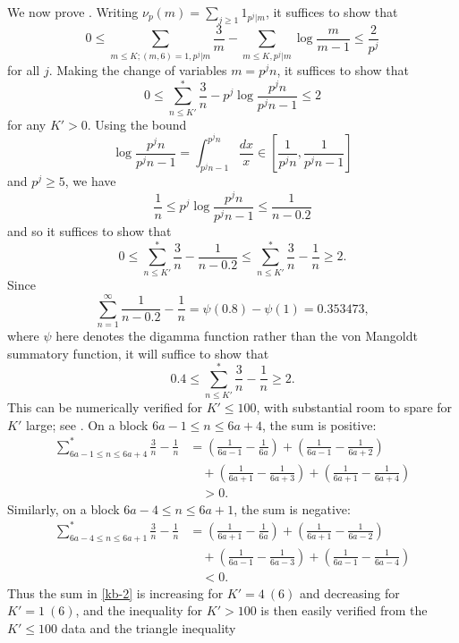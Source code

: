 \documentclass[12pt,a4paper,reqno]{amsart}
\numberwithin{equation}{section}
\theoremstyle{plain}
\theoremstyle{definition}
\begin{document}
We now prove . Writing $\nu_p(m) = \sum_{j \geq 1} 1_{p^j|m}$, it suffices to show that
  $$ 0 \leq \sum_{m \leq K; (m,6)=1, p^j|m} \frac{3}{m}
  - \sum_{m \leq K, p^j|m} \log \frac{m}{m-1} \leq \frac{2}{p^j}$$
  for all $j$.  Making the change of variables $m = p^j n$, it suffices to show that
  $$ 0 \leq \sum_{n \leq K'}^* \frac{3}{n}  - p^j \log \frac{p^j n}{p^j n - 1} \leq 2$$
  for any $K' > 0$.   Using the bound
  $$ \log \frac{p^jn}{p^jn - 1} = \int_{p^jn-1}^{p^jn} \frac{dx}{x} \in \left[\frac{1}{p^j n}, \frac{1}{p^jn-1}\right]$$
  and $p^j \geq 5$, we have
  $$ \frac{1}{n} \leq p^j \log \frac{p^j n}{p^j n - 1} \leq \frac{1}{n-0.2}$$
  and so it suffices to show that
  \begin{equation}\label{kb}
  0 \leq \sum_{n \leq K'}^* \frac{3}{n}  - \frac{1}{n-0.2} 
  \leq
  \sum_{n \leq K'}^* \frac{3}{n} - \frac{1}{n} \geq 2.
  \end{equation}
  Since 
  $$ \sum_{n=1}^\infty \frac{1}{n-0.2}-\frac{1}{n} = \psi(0.8)-\psi(1) = 0.353473,$$
  where $\psi$ here denotes the digamma function rather than the von Mangoldt summatory function, it will suffice to show that
  \begin{equation}\label{kb-2} 0.4 \leq
  \sum_{n \leq K'}^* \frac{3}{n} - \frac{1}{n} \geq 2.\end{equation}
  This can be numerically verified for $K' \leq 100$, with substantial room to spare for $K'$ large; see . On a block $6a-1 \leq n \leq 6a+4$, the sum is positive:
  \begin{align*}
  \sum_{6a-1 \leq n \leq 6a+4}^* \frac{3}{n}  - \frac{1}{n } &= \left(\frac{1}{6a-1} - \frac{1}{6a}\right) + \left(\frac{1}{6a-1} - \frac{1}{6a+2}\right)\\
  &\quad + \left(\frac{1}{6a+1} - \frac{1}{6a+3}\right) + \left(\frac{1}{6a+1} - \frac{1}{6a+4}\right) \\
  &\quad > 0.
  \end{align*}
  Similarly, on a block $6a-4 \leq n \leq 6a+1$, the sum is negative:
  \begin{align*}
    \sum_{6a-4 \leq n \leq 6a+1}^* \frac{3}{n}  - \frac{1}{n } &= \left(\frac{1}{6a+1} - \frac{1}{6a}\right)
    + \left(\frac{1}{6a+1} - \frac{1}{6a-2}\right)\\
    &\quad  + \left(\frac{1}{6a-1} - \frac{1}{6a-3}\right)
    + \left(\frac{1}{6a-1} - \frac{1}{6a-4}\right)\\
    &\quad  < 0.
  \end{align*}
  Thus the sum in \eqref{kb-2} is increasing for $K' = 4\ (6)$ and decreasing for $K' = 1\ (6)$, and the inequality for $K'>100$ is then easily verified from the $K' \leq 100$ data and the triangle inequality
  
\end{document}
